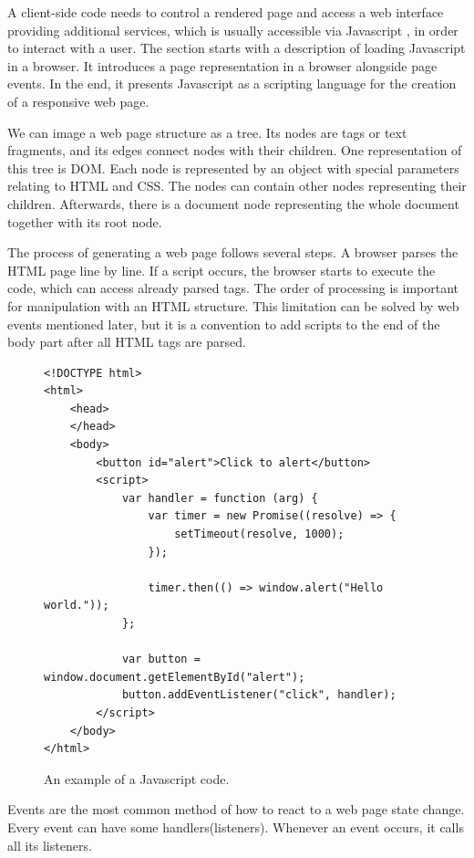 A client-side code needs to control a rendered page and access a web interface providing additional services, which is usually accessible via Javascript \cite{online:javascriptWiki}, in order to interact with a user.
The section starts with a description of loading Javascript in a browser.
It introduces a page representation in a browser alongside page events.
In the end, it presents Javascript as a scripting language for the creation of a responsive web page.
\par
We can image a web page structure as a tree.
Its nodes are tags or text fragments, and its edges connect nodes with their children.
One representation of this tree is \ac{DOM}.
Each node is represented by an object with special parameters relating to HTML and CSS. 
The nodes can contain other nodes representing their children.
Afterwards, there is a document node representing the whole document together with its root node.
\par
The process of generating a web page follows several steps.
A browser parses the HTML page line by line. If a script occurs, the browser starts to execute the code, which can access already parsed tags.
The order of processing is important for manipulation with an HTML structure.
This limitation can be solved by web events mentioned later, but
it is a convention to add scripts to the end of the body part after all HTML tags are parsed.
\par
\begin{figure}[b!]
\begin{lstlisting}
<!DOCTYPE html>
<html>
    <head>
    </head>
    <body>
        <button id="alert">Click to alert</button>
        <script>
            var handler = function (arg) {
                var timer = new Promise((resolve) => {
                    setTimeout(resolve, 1000);
                }); 
        
                timer.then(() => window.alert("Hello world."));
            };  

            var button = window.document.getElementById("alert");
            button.addEventListener("click", handler);
        </script>
    </body>
</html>
\end{lstlisting}
\caption{An example of a Javascript code.}
\label{img02:javascript}
\end{figure}
\par
Events are the most common method of how to react to a web page state change.
Every event can have some handlers(listeners).
Whenever an event occurs, it calls all its listeners.
